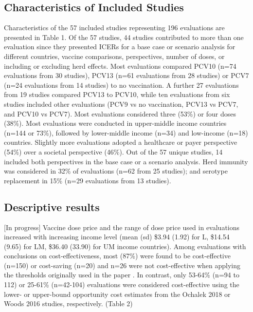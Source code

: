 \documentclass[12pt]{article}
\begin{document}
\subsection{Characteristics of Included Studies}
Characteristics of the 57 included studies representing 196 evaluations are presented in Table 1. Of the 57 studies, 44 studies contributed to more than one evaluation  since they presented ICERs for a base case or scenario analysis for different countries, vaccine comparisons, perspectives, number of doses, or including or excluding herd effects. Most evaluations compared PCV10 (n=74 evaluations from 30 studies), PCV13 (n=61 evaluations from 28 studies) or PCV7 (n=24 evaluations from 14 studies) to no vaccination. A further 27 evaluations from 19 studies compared PCV13 to PCV10, while ten evaluations from six studies included other evaluations (PCV9 vs no vaccination, PCV13 vs PCV7, and PCV10 vs PCV7). Most evaluations considered three (53\%) or four doses (38\%). Most evaluations were conducted in upper-middle income countries (n=144 or 73\%), followed by lower-middle income (n=34) and low-income (n=18) countries. Slightly more evaluations adopted a healthcare or payer perspective (54\%) over a societal perspective (46\%). Out of the 57 unique studies, 14 included both perspectives in the base case or a scenario analysis. Herd immunity was considered in 32\% of evaluations (n=62 from 25 studies); and serotype replacement in 15\% (n=29 evaluations from 13 studies). 

\subsection{Descriptive results}
[In progress]
Vaccine dose price and the range of dose price used in evaluations increased with increasing income level (mean (sd) \$3.94 (1.92) for L, \$14.54 (9.65) for LM, \$36.40 (33.90)  for UM income countries). 
Among evaluations with conclusions on cost-effectiveness, most (87\%) were found to be cost-effective (n=150) or cost-saving (n=20) and n=26 were not cost-effective when applying the thresholds originally used in the paper . In contrast, only 53-64\% (n=94 to 112) or 25-61\% (n=42-104) evaluations were considered cost-effective using the lower- or upper-bound opportunity cost estimates from the Ochalek 2018 or Woods 2016 studies, respectively. (Table 2)
\end{document}
